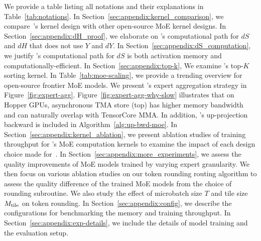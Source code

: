 We provide a table listing all notations and their explanations in Table~\ref{tab:notations}. In Section~\ref{sec:appendix:kernel_comparison}, we compare~\Algname's kernel design with other open-source MoE kernel designs. In Section~\ref{sec:appendix:dH_proof}, we elaborate on \Algname's computational path for $dS$ and $dH$ that does not use $Y$ and $dY$. In Section~\ref{sec:appendix:dS_computation}, we justify \Algname's computational path for $dS$ is both activation memory and computationally-efficient. In Section~\ref{sec:appendix:top-k}, We examine \Algname's top-$K$ sorting kernel. In Table~\ref{tab:moe-scaling}, we provide a trending overview for open-source frontier MoE models. We present \Algname's expert aggregation strategy in Figure~\ref{fig:expert-agg}. Figure~\ref{fig:expert-agg-why-slow} illustrates that on Hopper GPUs, asynchronous TMA store (top) has higher memory bandwidth and can naturally overlap with TensorCore MMA. In addition, \Algname's up-projection backward is included in Algorithm~\ref{alg:up-bwd-moe}. In Section~\ref{sec:appendix:kernel_ablation}, we present ablation studies of training throughput for \Algname's MoE computation kernels to examine the impact of each design choice made for~\Algname. In Section~\ref{sec:appendix:more_experiments}, we assess the quality improvements of MoE models trained by varying expert granularity. We then focus on various ablation studies on our token rounding routing algorithm to assess the quality difference of the trained MoE models from the choice of rounding subroutine. We also study the effect of microbatch size $T$ and tile size $M_\mathrm{tile}$ on token rounding. In Section~\ref{sec:appendix:config}, we describe the configurations for benchmarking the memory and training throughput. In Section~\ref{sec:appendix:exp-details}, we include the details of model training and the evaluation setup. 

